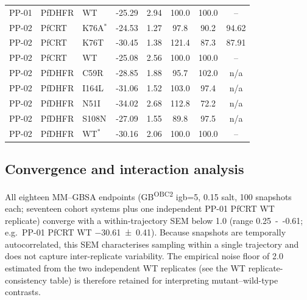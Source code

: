 \documentclass[journal=jcisd8,manuscript=suppinfo,layout=traditional]{achemso}
\begin{document}
\begin{table}[htbp]
\begin{tabularx}{\textwidth}{l l l S[table-format=-2.2] S[table-format=1.2] S[table-format=3.1] S[table-format=3.1] S[table-format=3.2]}
PP-01 & PfDHFR & WT & -25.29 & 2.94 & 100.0 & 100.0 & {--} \\
PP-02 & PfCRT & K76A$^\ast$ & -24.53 & 1.27 & 97.8 & 90.2 & 94.62 \\
PP-02 & PfCRT & K76T & -30.45 & 1.38 & 121.4 & 87.3 & 87.91 \\
PP-02 & PfCRT & WT & -25.08 & 2.56 & 100.0 & 100.0 & {--} \\
PP-02 & PfDHFR & C59R & -28.85 & 1.88 & 95.7 & 102.0 & n/a \\
PP-02 & PfDHFR & I164L & -31.06 & 1.52 & 103.0 & 97.4 & n/a \\
PP-02 & PfDHFR & N51I & -34.02 & 2.68 & 112.8 & 72.2 & n/a \\
PP-02 & PfDHFR & S108N & -27.09 & 1.55 & 89.8 & 97.5 & n/a \\
PP-02 & PfDHFR & WT$^\ast$ & -30.16 & 2.06 & 100.0 & 100.0 & {--} \\
\bottomrule
\end{tabularx}
\setlength{\tabcolsep}{6pt}
\end{table}



\subsection*{Convergence and interaction analysis}
All eighteen MM--GBSA endpoints (GB\textsuperscript{OBC2} igb=5, \qty{0.15}{\molar} salt, \num{100} snapshots each; seventeen cohort systems plus one independent PP-01 PfCRT WT replicate) converge with a within-trajectory SEM below \qty{1.0}{\kcalmol} (range \qty{0.25}{--}\qty{0.61}{\kcalmol}; e.g.\ PP-01 PfCRT WT \qty{-30.61\pm0.41}{\kcalmol}). Because snapshots are temporally autocorrelated, this SEM characterises sampling within a single trajectory and does not capture inter-replicate variability. The empirical noise floor of \qty{2.0}{\kcalmol} estimated from the two independent WT replicates (see the WT replicate-consistency table) is therefore retained for interpreting mutant--wild-type contrasts.
\end{document}

